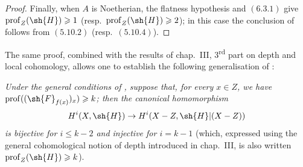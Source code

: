 \begin{proof}
Finally, when $A$ is Noetherian, the flatness hypothesis and $(6.3.1)$ give $\operatorname{prof}_Z(\sh{H})\geqslant1$ (resp.\ $\operatorname{prof}_Z(\sh{H})\geqslant2$); in this case the conclusion of  follows from $(5.10.2)$ (resp.\ $(5.10.4)$).
\end{proof}

\begin{remark}[19.9.9]
\label{IV.19.9.9}
The same proof, combined with the results of chap.~III, 3\textsuperscript{rd} part on depth and local cohomology, allows one to establish the following generalisation of :

\emph{Under the general conditions of , suppose that, for every $x\in Z$, we have $\operatorname{prof}((\sh{F}_{f(x)})_x)\geqslant k$; then the canonical homomorphism}
\[
  H^i(X,\sh{H})\to H^i(X-Z,\sh{H}|(X-Z))
\]
\emph{is bijective for $i\leqslant k-2$ and injective for $i=k-1$} (which, expressed using the general cohomological notion of depth introduced in chap.~III, is also written $\operatorname{prof}_Z(\sh{H})\geqslant k$).
\end{remark}
